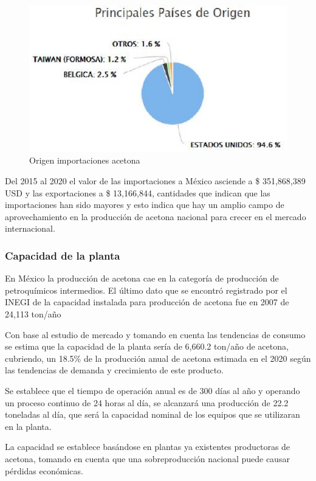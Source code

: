         \begin{figure}[H]
            \centering
            \includegraphics[scale= 0.7]{images/importacetona.eps}
            \caption{Origen importaciones acetona}
            \label{graf_acetona}
        \end{figure}

    Del 2015 al 2020 el valor de las importaciones a México asciende a \$ 351,868,389 USD y las exportaciones a \$ 13,166,844, cantidades que indican que las importaciones han sido mayores y esto indica que hay un amplio campo de aprovechamiento en la producción de acetona nacional para crecer en el mercado internacional.

    \subsubsection*{Capacidad de la planta}
    En México la producción de acetona cae en la categoría de producción de petroquímicos intermedios. El último dato que se encontró registrado por el INEGI de la capacidad instalada para producción de acetona fue en 2007 de 24,113 ton/año \cite{INEGI2009}

    Con base al estudio de mercado y tomando en cuenta las tendencias de consumo se estima que la capacidad de la planta sería de 6,660.2 ton/año de acetona, cubriendo, un 18.5\% de la producción anual de acetona estimada en el 2020 según las tendencias de demanda y crecimiento de este producto.

    Se establece que el tiempo de operación anual es de 300 días al año y operando un proceso continuo de 24 horas al día, se alcanzará una producción de 22.2 toneladas al día, que será la capacidad nominal de los equipos que se utilizaran en la planta.

    La capacidad se establece basándose en plantas ya existentes productoras de acetona, tomando en cuenta que una sobreproducción nacional puede causar pérdidas económicas.
